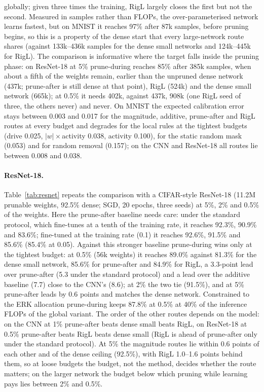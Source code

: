 \documentclass[11pt]{article}
\begin{document}
globally; given three times the training, RigL largely closes the first but not the second. Measured in
samples rather
than FLOPs, the over-parameterised network learns fastest, but on MNIST it reaches 97\% after 87k samples, before pruning
begins, so this is a property of the dense start that every large-network route shares (against 133k--436k samples for the
dense small networks and 124k--445k for RigL). The comparison is informative where the target falls inside the pruning
phase: on ResNet-18 at 5\% prune-during reaches 85\% after 385k samples, when about a fifth of the weights remain, earlier
than the unpruned dense network (437k; prune-after is still dense at that point), RigL (524k) and the dense small network
(665k); at 0.5\% it needs 402k, against 437k, 908k (one RigL seed of three, the others never) and never. On MNIST the expected calibration error stays between 0.003 and 0.017 for the magnitude, additive, prune-after and
RigL routes at every budget and degrades for the local rules at the tightest budgets (drive 0.025, $|w|\times$activity
0.038, activity 0.100), for the static random mask (0.053) and for random removal (0.157); on the CNN and ResNet-18 all
routes lie between 0.008 and 0.038.

\paragraph{ResNet-18.} Table~\ref{tab:resnet} repeats the comparison with a CIFAR-style ResNet-18 (11.2M prunable
weights, 92.5\% dense; SGD, 20 epochs, three seeds) at 5\%, 2\% and 0.5\% of the weights. Here the prune-after baseline needs care: under the
standard protocol, which fine-tunes at a tenth of the training rate, it reaches 92.3\%, 90.9\% and 83.6\%; fine-tuned at
the training rate (0.1) it reaches 92.6\%, 91.5\% and 85.6\% (85.4\% at 0.05). Against this stronger baseline
prune-during wins only at the tightest budget: at 0.5\% (56k weights) it reaches 89.0\% against 81.3\% for the dense small
network, 85.6\% for prune-after and 84.9\% for RigL, a 3.3-point lead over prune-after (5.3 under the standard protocol)
and a lead over the additive baseline (7.7) close to the CNN's (8.6); at 2\% the two tie (91.5\%), and at 5\% prune-after
leads by 0.6 points and matches the dense network. Constrained to the ERK allocation prune-during keeps 87.8\% at 0.5\% at
40\% of the inference FLOPs of the global variant. The order of the other routes depends on the model: on the CNN at 1\%
prune-after beats dense small beats RigL, on ResNet-18 at 0.5\% prune-after beats RigL beats dense small (RigL is ahead of
prune-after only under the standard protocol). At 5\% the magnitude routes lie within 0.6 points of each other and of the
dense ceiling (92.5\%), with RigL 1.0--1.6 points behind them, so at loose budgets the budget, not the method, decides
whether the route matters; on the larger network the budget below which pruning while learning pays lies between 2\% and
0.5\%.
\end{document}
